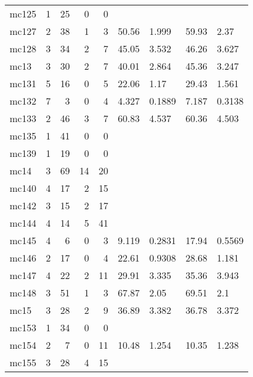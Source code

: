 \documentclass{article}
\begin{document}
\begin{longtable}{lrrrrllll}
 mc125 &  1 &  25 &        0 &          0 &        &            &        &           \\
 mc127 &  2 &  38 &        1 &          3 &  50.56 &      1.999 &  59.93 &      2.37 \\
 mc128 &  3 &  34 &        2 &          7 &  45.05 &      3.532 &  46.26 &     3.627 \\
  mc13 &  3 &  30 &        2 &          7 &  40.01 &      2.864 &  45.36 &     3.247 \\
 mc131 &  5 &  16 &        0 &          5 &  22.06 &       1.17 &  29.43 &     1.561 \\
 mc132 &  7 &   3 &        0 &          4 &  4.327 &     0.1889 &  7.187 &    0.3138 \\
 mc133 &  2 &  46 &        3 &          7 &  60.83 &      4.537 &  60.36 &     4.503 \\
 mc135 &  1 &  41 &        0 &          0 &        &            &        &           \\
 mc139 &  1 &  19 &        0 &          0 &        &            &        &           \\
  mc14 &  3 &  69 &       14 &         20 &        &            &        &           \\
 mc140 &  4 &  17 &        2 &         15 &        &            &        &           \\
 mc142 &  3 &  15 &        2 &         17 &        &            &        &           \\
 mc144 &  4 &  14 &        5 &         41 &        &            &        &           \\
 mc145 &  4 &   6 &        0 &          3 &  9.119 &     0.2831 &  17.94 &    0.5569 \\
 mc146 &  2 &  17 &        0 &          4 &  22.61 &     0.9308 &  28.68 &     1.181 \\
 mc147 &  4 &  22 &        2 &         11 &  29.91 &      3.335 &  35.36 &     3.943 \\
 mc148 &  3 &  51 &        1 &          3 &  67.87 &       2.05 &  69.51 &       2.1 \\
  mc15 &  3 &  28 &        2 &          9 &  36.89 &      3.382 &  36.78 &     3.372 \\
 mc153 &  1 &  34 &        0 &          0 &        &            &        &           \\
 mc154 &  2 &   7 &        0 &         11 &  10.48 &      1.254 &  10.35 &     1.238 \\
 mc155 &  3 &  28 &        4 &         15 &        &            &        &           \\

\end{longtable}
\end{document}

